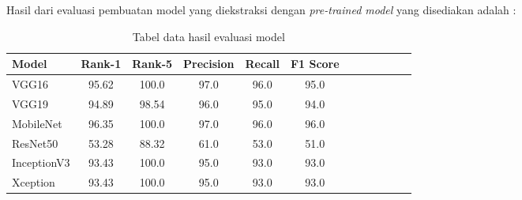 \par Hasil dari evaluasi pembuatan model yang diekstraksi dengan \textit{pre-trained model} yang disediakan adalah :


\begin{table}[ht]
	\centering
	\begin{tabularx}{1.0\textwidth}
		{|X*{6}{c}|X|X|X|X|X|}
	\hline
	\centering Model&Rank-1&Rank-5&Precision&Recall&F1 Score \\ \hline
	\centering VGG16	& 	95.62	& 100.0	& 	97.0	& 96.0	&	95.0 \\ \hline
	\centering VGG19	& 94.89	&	98.54 &	96.0	&95.0	& 94.0 \\ \hline
	\centering MobileNet	&	96.35	& 100.0	& 97.0	& 96.0 &	96.0 \\ \hline
	\centering ResNet50	& 53.28	& 88.32 &	61.0	& 53.0	& 51.0 \\ \hline
	\centering InceptionV3	&	93.43	& 100.0	& 95.0 & 93.0 & 93.0 \\ \hline
	\centering Xception	&	93.43	& 100.0	& 95.0 & 93.0 & 93.0 \\
	\end{tabularx}
	\caption{Tabel data hasil evaluasi model}
	\label{table:hasil}
\end{table}
